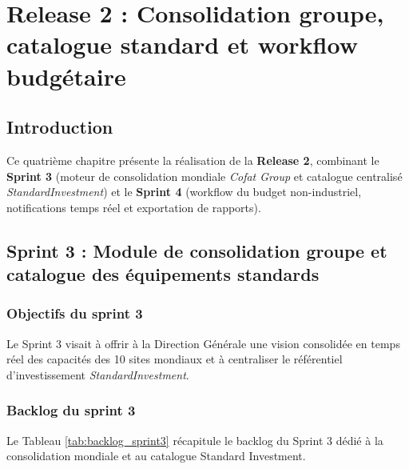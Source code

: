 \chapter{Release 2 : Consolidation groupe, catalogue standard et workflow budgétaire}
\label{chap:release2}


\section*{Introduction}

Ce quatrième chapitre présente la réalisation de la \textbf{Release 2}, combinant le \textbf{Sprint 3} (moteur de consolidation mondiale \textit{Cofat Group} et catalogue centralisé \textit{StandardInvestment}) et le \textbf{Sprint 4} (workflow du budget non-industriel, notifications temps réel et exportation de rapports).

\section{Sprint 3 : Module de consolidation groupe et catalogue des équipements standards}

\subsection{Objectifs du sprint 3}
Le Sprint 3 visait à offrir à la Direction Générale une vision consolidée en temps réel des capacités des 10 sites mondiaux et à centraliser le référentiel d'investissement \textit{StandardInvestment}.

\subsection{Backlog du sprint 3}
Le Tableau \ref{tab:backlog_sprint3} récapitule le backlog du Sprint 3 dédié à la consolidation mondiale et au catalogue Standard Investment.

